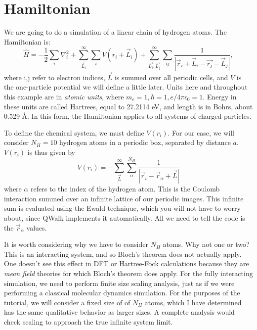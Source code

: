 \documentclass[12pt]{article}
\begin{document}
\section*{Hamiltonian}

We are going to do a simulation of a linear chain of hydrogen atoms. 
The Hamiltonian is:
\begin{equation}
\hat{H}=-\frac{1}{2}\sum_i \nabla_i^2 + \sum_{\vec{L}_i}^\infty\sum_i V(r_i+\vec{L}_i) + \sum_{\vec{L_i},\vec{L_j} }^\infty \sum_{ij} \frac{1}{|\vec{r}_i+\vec{L}_i-\vec{r_j}-\vec{L}_j|},
\end{equation}
where i,j refer to electron indices, $\vec{L}$ is summed over all periodic cells, and $V$ is the one-particle potential we will define a little later.
Units here and throughout this example are in {\it atomic units}, where $m_e=1,\hbar=1,e/4\pi\epsilon_0=1$.
Energy in these units are called Hartrees, equal to 27.2114 eV, and length is in Bohrs, about 0.529 \AA.
In this form, the Hamiltonian applies to all systems of charged particles. 

To define the chemical system, we must define $V(r_i)$. For our case, we will consider $N_H=10$ hydrogen atoms in a periodic box, separated by distance $a$.
$V(r_i)$ is thus given by 
\begin{equation}
V(r_i)	= -\sum_{\vec{L}}^\infty \sum_\alpha^{N_H} \frac{1}{|\vec{r}_i -\vec{r}_\alpha+\vec{L}|}
\end{equation}
where $\alpha$ refers to the index of the hydrogen atom.
This is the Coulomb interaction summed over an infinite lattice of our periodic images.
This infinite sum is evaluated using the Ewald technique, which you will not have to worry about, since QWalk implements it automatically. 
All we need to tell the code is the $\vec{r}_\alpha$ values.

It is worth considering why we have to consider $N_H$ atoms.
Why not one or two?
This is an interacting system, and so Bloch's theorem does not actually apply.
One doesn't see this effect in DFT or Hartree-Fock calculations because they are {\it mean field} theories for which Bloch's theorem does apply. 
For the fully interacting simulation, we need to perform finite size scaling analysis, just as if we were performing a classical molecular dynamics simulation.
For the purposes of the tutorial, we will consider a fixed size of of $N_H$ atoms, which I have determined has the same qualitative behavior as larger sizes.
A complete analysis would check scaling to approach the true infinite system limit.
\end{document}
